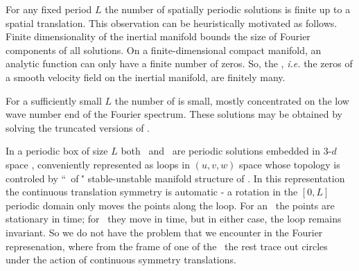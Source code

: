 For any fixed period $L$
the number 
of spatially periodic solutions is finite up to a spatial translation.
This observation can be heuristically motivated as follows. 
Finite dimensionality of the inertial manifold
bounds the size of Fourier components of all solutions.
On a finite-dimensional compact manifold,
an analytic function can only have a finite number
of zeros. So, the {\eqva}, {\em i.e.}
the zeros of a smooth velocity field on
the inertial manifold, are finitely many.

For a sufficiently small $L$ 
the number of {\eqva} is small,
mostly
concentrated on the low wave number end of the Fourier spectrum.
These solutions may
be obtained by solving the truncated versions of . 








In a periodic box of size $L$
both \eqva\ and \reqva\ are  periodic solutions 
embedded in 3-$d$ space , 
conveniently represented as loops in 
$(u,v,w)$ space whose topology is controled by
``\eqva\ of \eqva\'' stable-unstable manifold structure of
.
In this representation the continuous translation symmetry
is automatic - a rotation in the $[0,L]$ periodic domain only
moves the points along the loop. For an \eqv\ the points
are stationary in time; for \reqv\ they move in time, but in
either case, the loop remains invariant.
So we do not have the problem that we encounter in the Fourier 
represenation, where from the frame of one of the \eqva\
the rest trace out circles under the action of continuous symmetry 
translations.

